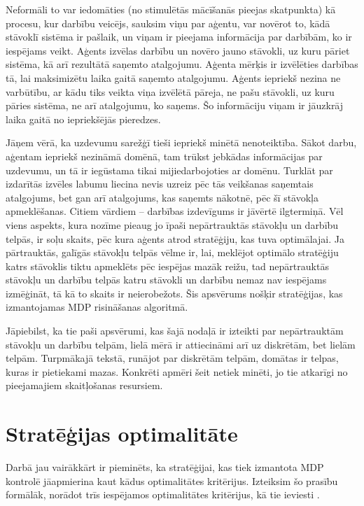 \documentclass{ludis} %
\begin{document}
Neformāli to var iedomāties (no stimulētās mācīšanās pieejas skatpunkta) kā procesu, kur darbību veicējs, sauksim viņu par aģentu, var novērot to, kādā 
stāvoklī sistēma ir pašlaik, un viņam ir pieejama informācija par darbībām, ko ir iespējams veikt.
Aģents izvēlas darbību un novēro jauno stāvokli, uz kuru pāriet sistēma, kā arī rezultātā saņemto atalgojumu.
Aģenta mērķis ir izvēlēties darbības tā, lai maksimizētu laika gaitā saņemto atalgojumu.
Aģents iepriekš nezina ne varbūtību, ar kādu tiks veikta viņa izvēlētā pāreja, ne pašu stāvokli, uz kuru pāries sistēma, ne arī atalgojumu, ko saņems.
Šo informāciju viņam ir jāuzkrāj laika gaitā no iepriekšējās pieredzes.

Jāņem vērā, ka uzdevumu sarežģī tieši iepriekš minētā nenoteiktība.
Sākot darbu, aģentam iepriekš nezināmā domēnā, tam trūkst jebkādas informācijas par uzdevumu, un tā ir iegūstama tikai mijiedarbojoties ar domēnu.
Turklāt par izdarītās izvēles labumu liecina nevis uzreiz pēc tās veikšanas saņemtais atalgojums, bet gan arī atalgojums, kas saņemts nākotnē, pēc šī stāvokļa apmeklēšanas.
Citiem vārdiem -- darbības izdevīgums ir jāvērtē ilgtermiņā.
Vēl viens aspekts, kura nozīme pieaug jo īpaši nepārtrauktās stāvokļu un darbību telpās, ir soļu skaits, pēc kura aģents atrod stratēģiju, kas tuva optimālajai.
Ja pārtrauktās, galīgās stāvokļu telpās vēlme ir, lai, meklējot optimālo stratēģiju katrs stāvoklis tiktu apmeklēts pēc iespējas mazāk reižu, tad nepārtrauktās stāvokļu un darbību telpās katru stāvokli un darbību nemaz nav iespējams izmēģināt, tā kā to skaits ir neierobežots.
Šis apsvērums nošķir stratēģijas, kas izmantojamas MDP risināšanas algoritmā. %




Jāpiebilst, ka tie paši apsvērumi, kas šajā nodaļā ir izteikti par nepārtrauktām stāvokļu un darbību telpām, lielā mērā ir attiecināmi arī uz diskrētām, bet lielām telpām.
Turpmākajā tekstā, runājot par diskrētām telpām, domātas ir telpas, kuras ir pietiekami mazas.
Konkrēti apmēri šeit netiek minēti, jo tie atkarīgi no pieejamajiem skaitļošanas resursiem.

\section{Stratēģijas optimalitāte}
Darbā jau vairākkārt ir pieminēts, ka stratēģijai, kas tiek izmantota MDP kontrolē jāapmierina kaut kādus optimalitātes kritērijus.
Izteiksim šo prasību formālāk, norādot trīs iespējamos optimalitātes kritērijus, kā tie ieviesti \autocite{Otterlo}.
\end{document}
